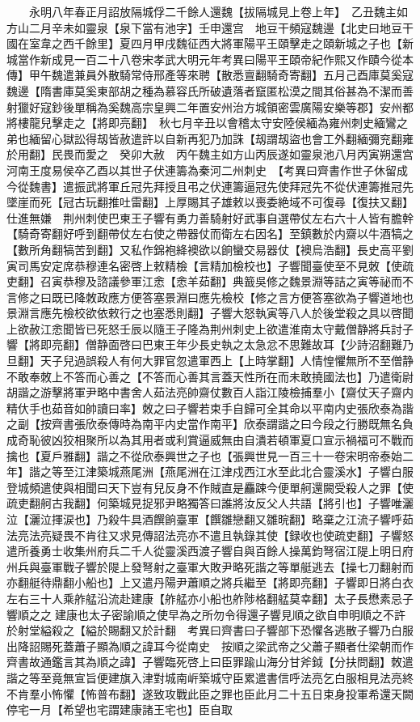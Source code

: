 　　永明八年春正月詔放隔城俘二千餘人還魏【拔隔城見上卷上年】　乙丑魏主如方山二月辛未如靈泉【泉下當有池字】壬申還宫　地豆干頻寇魏邊【北史曰地豆干國在室韋之西千餘里】夏四月甲戌魏征西大將軍陽平王頤擊走之頤新城之子也【新城當作新成見一百二十八卷宋孝武大明元年考異曰陽平王頤帝紀作熙又作賾今從本傳】甲午魏遣兼員外散騎常侍邢產等來聘【散悉亶翻騎奇寄翻】五月己酉庫莫奚寇魏邊【隋書庫莫奚東部胡之種為慕容氏所破遺落者竄匿松漠之間其俗甚為不潔而善射獵好寇鈔後單稱為奚魏高宗皇興二年置安州治方城領密雲廣陽安樂等郡】安州都將樓龍兒擊走之【將即亮翻】　秋七月辛丑以會稽太守安陸侯緬為雍州刺史緬鸞之弟也緬留心獄訟得刼皆赦遣許以自新再犯乃加誅【刼謂刼盜也會工外翻緬彌兖翻雍於用翻】民畏而愛之　癸卯大赦　丙午魏主如方山丙辰遂如靈泉池八月丙寅朔還宫　河南王度易侯卒乙酉以其世子伏連籌為秦河二州刺史　【考異曰齊書作世子休留成今從魏書】遣振武將軍丘冠先拜授且弔之伏連籌逼冠先使拜冠先不從伏連籌推冠先墜崖而死【冠古玩翻推吐雷翻】上厚賜其子雄敕以喪委絶域不可復尋【復扶又翻】仕進無嫌　荆州刺使巴東王子響有勇力善騎射好武事自選帶仗左右六十人皆有膽幹【騎奇寄翻好呼到翻帶仗左右使之帶器仗而衛左右因名】至鎮數於内齋以牛酒犒之【數所角翻犒苦到翻】又私作錦袍絳襖欲以餉蠻交易器仗【襖烏浩翻】長史高平劉寅司馬安定席恭穆連名密啓上敕精檢【言精加檢校也】子響聞臺使至不見敇【使疏吏翻】召寅恭穆及諮議參軍江悆【悆羊茹翻】典籖吳修之魏景淵等詰之寅等祕而不言修之曰既已降敇政應方便答塞景淵曰應先檢校【修之言方便答塞欲為子響道地也景淵言應先檢校欲依敕行之也塞悉則翻】子響大怒執寅等八人於後堂殺之具以啓聞上欲赦江悆聞皆已死怒壬辰以隨王子隆為荆州刺史上欲遣淮南太守戴僧静將兵討子響【將即亮翻】僧静面啓曰巴東王年少長史執之太急忿不思難故耳【少詩沼翻難乃旦翻】天子兒過誤殺人有何大罪官忽遣軍西上【上時掌翻】人情惶懼無所不至僧静不敢奉敇上不答而心善之【不答而心善其言蓋天性所在而未敢撓國法也】乃遣衛尉胡諧之游擊將軍尹略中書舍人茹法亮帥齋仗數百人詣江陵檢捕羣小【齋仗天子齋内精㐲手也茹音如帥讀曰率】敇之曰子響若束手自歸可全其命以平南内史張欣泰為諧之副【按齊書張欣泰傳時為南平内史當作南平】欣泰謂諧之曰今段之行勝既無名負成奇恥彼凶狡相聚所以為其用者或利賞逼威無由自潰若頓軍夏口宣示禍福可不戰而擒也【夏戶雅翻】諧之不從欣泰興世之子也【張興世見一百三十一卷宋明帝泰始二年】諧之等至江津築城燕尾洲【燕尾洲在江津戍西江水至此北合靈溪水】子響白服登城頻遣使與相聞曰天下豈有兒反身不作賊直是麤踈今便單舸還闕受殺人之罪【使疏吏翻舸古我翻】何築城見捉邪尹略獨答曰誰將汝反父人共語【將引也】子響唯灑泣【灑泣揮涙也】乃殺牛具酒饌餉臺軍【饌雛戀翻又雛晥翻】略棄之江流子響呼茹法亮法亮疑畏不肯往又求見傳詔法亮亦不遣且執錄其使【録收也使疏吏翻】子響怒遣所養勇士收集州府兵二千人從靈溪西渡子響自與百餘人操萬鈞弩宿江隄上明日府州兵與臺軍戰子響於隄上發弩射之臺軍大敗尹略死諧之等單艇逃去【操七刀翻射而亦翻艇待鼎翻小船也】上又遣丹陽尹蕭順之將兵繼至【將即亮翻】子響即日將白衣左右三十人乘舴艋沿流赴建康【舴艋亦小船也舴陟格翻艋莫幸翻】太子長懋素忌子響順之之建康也太子密諭順之使早為之所勿令得還子響見順之欲自申明順之不許於射堂縊殺之【縊於賜翻又於計翻　考異曰齊書曰子響部下恐懼各逃散子響乃白服出降詔賜死蓋蕭子顯為順之諱耳今從南史　按順之梁武帝之父蕭子顯者仕梁朝而作齊書故通鑑言其為順之諱】子響臨死啓上曰臣罪踰山海分甘斧鉞【分扶問翻】敇遣諧之等至竟無宣旨便建旗入津對城南㟁築城守臣累遣書信呼法亮乞白服相見法亮終不肯羣小怖懼【怖普布翻】遂致攻戰此臣之罪也臣此月二十五日束身投軍希還天闕停宅一月【希望也宅謂建康諸王宅也】臣自取